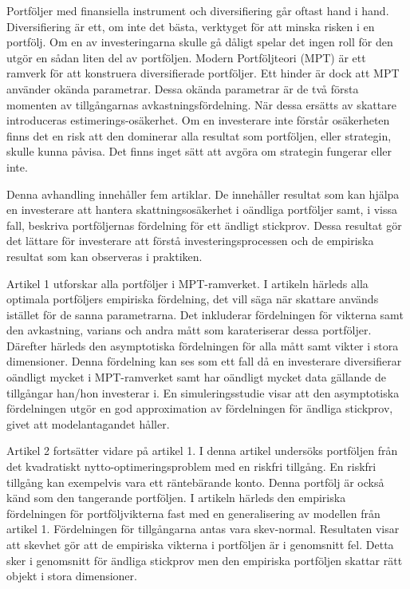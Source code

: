 Portföljer med finansiella instrument och diversifiering går oftast hand i hand.
Diversifiering är ett, om inte det bästa, verktyget för att minska risken i en portfölj.
Om en av investeringarna skulle gå dåligt spelar det ingen roll för den utgör en sådan liten del av portföljen.
Modern Portföljteori (MPT) är ett ramverk för att konstruera diversifierade portföljer.
Ett hinder är dock att MPT använder okända parametrar.
Dessa okända parametrar är de två första momenten av tillgångarnas avkastningsfördelning.
När dessa ersätts av skattare introduceras estimerings-osäkerhet.
Om en investerare inte förstår osäkerheten finns det en risk att den dominerar alla resultat som portföljen, eller strategin, skulle kunna påvisa.
Det finns inget sätt att avgöra om strategin fungerar eller inte.

Denna avhandling innehåller fem artiklar.
De innehåller resultat som kan hjälpa en investerare att hantera skattningsosäkerhet i oändliga portföljer samt, i vissa fall, beskriva portföljernas fördelning för ett ändligt stickprov.
Dessa resultat gör det lättare för investerare att förstå investeringsprocessen och de empiriska resultat som kan observeras i praktiken.

Artikel 1 utforskar alla portföljer i MPT-ramverket.
I artikeln härleds alla optimala portföljers empiriska fördelning, det vill säga när skattare används istället för de sanna parametrarna.
Det inkluderar fördelningen för vikterna samt den avkastning, varians och andra mått som karateriserar dessa portföljer.
Därefter härleds den asymptotiska fördelningen för alla mått samt vikter i stora dimensioner.
Denna fördelning kan ses som ett fall då en investerare diversifierar oändligt mycket i MPT-ramverket samt har oändligt mycket data gällande de tillgångar han/hon investerar i.
En simuleringsstudie visar att den asymptotiska fördelningen utgör en god approximation av fördelningen för ändliga stickprov, givet att modelantagandet håller.

Artikel 2 fortsätter vidare på artikel 1.
I denna artikel undersöks portföljen från det kvadratiskt nytto-optimeringsproblem med en riskfri tillgång. 
En riskfri tillgång kan exempelvis vara ett räntebärande konto.
Denna portfölj är också känd som den tangerande portföljen.
I artikeln härleds den empiriska fördelningen för portföljvikterna fast med en generalisering av modellen från artikel 1.
Fördelningen för tillgångarna antas vara skev-normal.
Resultaten visar att skevhet gör att de empiriska vikterna i portföljen är i genomsnitt fel.
Detta sker i genomsnitt för ändliga stickprov men den empiriska portföljen skattar rätt objekt i stora dimensioner. 

